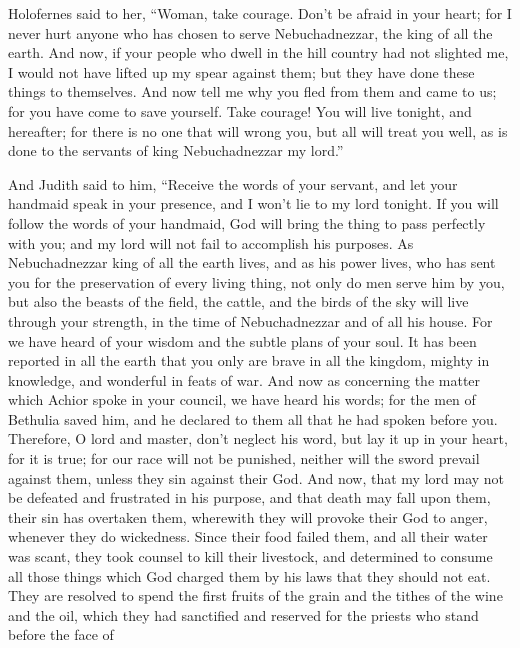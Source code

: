  Holofernes said to her, ``Woman, take courage. Don't be
afraid in your heart; for I never hurt anyone who has chosen to serve
Nebuchadnezzar, the king of all the earth.  And now, if your
people who dwell in the hill country had not slighted me, I would not
have lifted up my spear against them; but they have done these things to
themselves.  And now tell me why you fled from them and came
to us; for you have come to save yourself. Take courage! You will live
tonight, and hereafter;  for there is no one that will wrong
you, but all will treat you well, as is done to the servants of king
Nebuchadnezzar my lord.''

 And Judith said to him, ``Receive the words of your
servant, and let your handmaid speak in your presence, and I won't lie
to my lord tonight.  If you will follow the words of your
handmaid, God will bring the thing to pass perfectly with you; and my
lord will not fail to accomplish his purposes.  As
Nebuchadnezzar king of all the earth lives, and as his power lives, who
has sent you for the preservation of every living thing, not only do men
serve him by you, but also the beasts of the field, the cattle, and the
birds of the sky will live through your strength, in the time of
Nebuchadnezzar and of all his house.  For we have heard of
your wisdom and the subtle plans of your soul. It has been reported in
all the earth that you only are brave in all the kingdom, mighty in
knowledge, and wonderful in feats of war.  And now as
concerning the matter which Achior spoke in your council, we have heard
his words; for the men of Bethulia saved him, and he declared to them
all that he had spoken before you.  Therefore, O lord and
master, don't neglect his word, but lay it up in your heart, for it is
true; for our race will not be punished, neither will the sword prevail
against them, unless they sin against their God.  And now,
that my lord may not be defeated and frustrated in his purpose, and that
death may fall upon them, their sin has overtaken them, wherewith they
will provoke their God to anger, whenever they do wickedness.
 Since their food failed them, and all their water was
scant, they took counsel to kill their livestock, and determined to
consume all those things which God charged them by his laws that they
should not eat.  They are resolved to spend the first
fruits of the grain and the tithes of the wine and the oil, which they
had sanctified and reserved for the priests who stand before the face of
